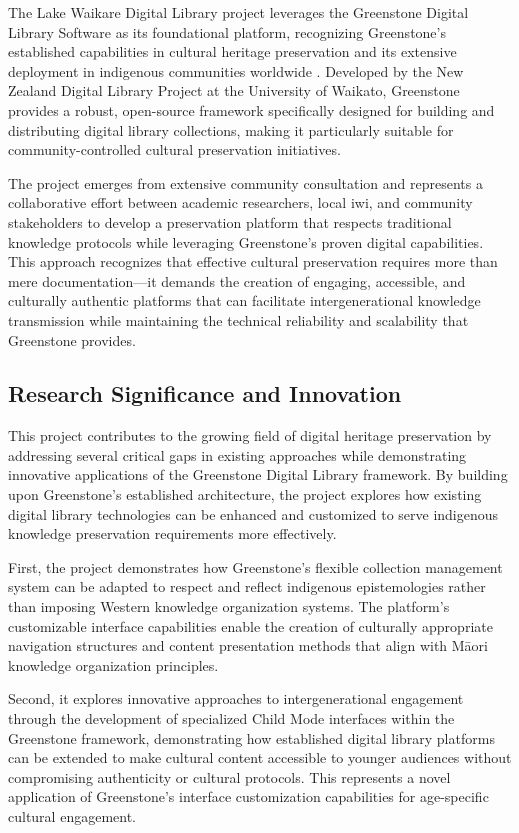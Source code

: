The Lake Waikare Digital Library project leverages the Greenstone Digital Library Software as its foundational platform, recognizing Greenstone's established capabilities in cultural heritage preservation and its extensive deployment in indigenous communities worldwide \cite{greenstone_2024}. Developed by the New Zealand Digital Library Project at the University of Waikato, Greenstone provides a robust, open-source framework specifically designed for building and distributing digital library collections, making it particularly suitable for community-controlled cultural preservation initiatives.

The project emerges from extensive community consultation and represents a collaborative effort between academic researchers, local iwi, and community stakeholders to develop a preservation platform that respects traditional knowledge protocols while leveraging Greenstone's proven digital capabilities. This approach recognizes that effective cultural preservation requires more than mere documentation—it demands the creation of engaging, accessible, and culturally authentic platforms that can facilitate intergenerational knowledge transmission while maintaining the technical reliability and scalability that Greenstone provides.

\subsection{Research Significance and Innovation}

This project contributes to the growing field of digital heritage preservation by addressing several critical gaps in existing approaches while demonstrating innovative applications of the Greenstone Digital Library framework. By building upon Greenstone's established architecture, the project explores how existing digital library technologies can be enhanced and customized to serve indigenous knowledge preservation requirements more effectively.

First, the project demonstrates how Greenstone's flexible collection management system can be adapted to respect and reflect indigenous epistemologies rather than imposing Western knowledge organization systems. The platform's customizable interface capabilities enable the creation of culturally appropriate navigation structures and content presentation methods that align with M\=aori knowledge organization principles.

Second, it explores innovative approaches to intergenerational engagement through the development of specialized Child Mode interfaces within the Greenstone framework, demonstrating how established digital library platforms can be extended to make cultural content accessible to younger audiences without compromising authenticity or cultural protocols. This represents a novel application of Greenstone's interface customization capabilities for age-specific cultural engagement.

